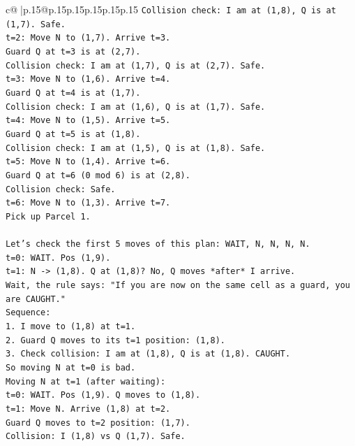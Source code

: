 \documentclass{article}
\begin{document}
{\begin{supertabular}{c@{$\;$}|p{.15\linewidth}@{}p{.15\linewidth}p{.15\linewidth}p{.15\linewidth}p{.15\linewidth}p{.15\linewidth}}
{{{\texttt{Collision check: I am at (1,8), Q is at (1,7). Safe.} \\
\texttt{t=2: Move N to (1,7). Arrive t=3.} \\
\texttt{Guard Q at t=3 is at (2,7).} \\
\texttt{Collision check: I am at (1,7), Q is at (2,7). Safe.} \\
\texttt{t=3: Move N to (1,6). Arrive t=4.} \\
\texttt{Guard Q at t=4 is at (1,7).} \\
\texttt{Collision check: I am at (1,6), Q is at (1,7). Safe.} \\
\texttt{t=4: Move N to (1,5). Arrive t=5.} \\
\texttt{Guard Q at t=5 is at (1,8).} \\
\texttt{Collision check: I am at (1,5), Q is at (1,8). Safe.} \\
\texttt{t=5: Move N to (1,4). Arrive t=6.} \\
\texttt{Guard Q at t=6 (0 mod 6) is at (2,8).} \\
\texttt{Collision check: Safe.} \\
\texttt{t=6: Move N to (1,3). Arrive t=7.} \\
\texttt{Pick up Parcel 1.} \\
\\ 
\texttt{Let's check the first 5 moves of this plan: WAIT, N, N, N, N.} \\
\texttt{t=0: WAIT. Pos (1,9).} \\
\texttt{t=1: N {-}> (1,8). Q at (1,8)? No, Q moves *after* I arrive.} \\
\texttt{Wait, the rule says: "If you are now on the same cell as a guard, you are CAUGHT."} \\
\texttt{Sequence:} \\
\texttt{1. I move to (1,8) at t=1.} \\
\texttt{2. Guard Q moves to its t=1 position: (1,8).} \\
\texttt{3. Check collision: I am at (1,8), Q is at (1,8). CAUGHT.} \\
\texttt{So moving N at t=0 is bad.} \\
\texttt{Moving N at t=1 (after waiting):} \\
\texttt{t=0: WAIT. Pos (1,9). Q moves to (1,8).} \\
\texttt{t=1: Move N. Arrive (1,8) at t=2.} \\
\texttt{Guard Q moves to t=2 position: (1,7).} \\
\texttt{Collision: I (1,8) vs Q (1,7). Safe.} \\
}}}
\end{supertabular}}
\end{document}
